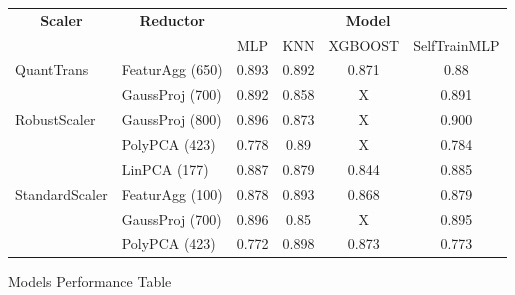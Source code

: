 \documentclass[letterpaper,11pt]{article}
\begin{document}
\begin{figure}[htb]
    \centering
    \caption{Models Performance Table}
    \label{fig:PerfTable}
    \begin{tabular}{@{}|l|lcccc|@{}}
        \toprule
        \multicolumn{1}{|c|}{\multirow{2}{*}{\textbf{Scaler}}} & \multicolumn{1}{c|}{\multirow{2}{*}{\textbf{Reductor}}} & \multicolumn{4}{c|}{\textbf{Model}} \\ \cmidrule(l){3-6} 
        \multicolumn{1}{|c|}{}            & \multicolumn{1}{c|}{} & MLP   & KNN   & XGBOOST & SelfTrainMLP \\ \midrule
        \multirow{2}{*}{QuantTrans}       & FeaturAgg (650)       & 0.893 & 0.892 & 0.871   & 0.88         \\
                                          & GaussProj (700)       & 0.892 & 0.858 & X       & 0.891        \\ \midrule
        \multirow{3}{*}{RobustScaler}   & GaussProj (800)       & 0.896 & 0.873 & X       & 0.900        \\
                                          & PolyPCA (423)         & 0.778 & 0.89  & X       & 0.784        \\
                                          & LinPCA (177)          & 0.887 & 0.879 & 0.844   & 0.885        \\ \midrule
        \multirow{3}{*}{StandardScaler} & FeaturAgg (100)       & 0.878 & 0.893 & 0.868   & 0.879        \\
                                          & GaussProj (700)       & 0.896 & 0.85  & X       & 0.895        \\
                                          & PolyPCA (423)         & 0.772 & 0.898 & 0.873   & 0.773        \\ \bottomrule
        \end{tabular}
    
\end{figure}
\end{document}
